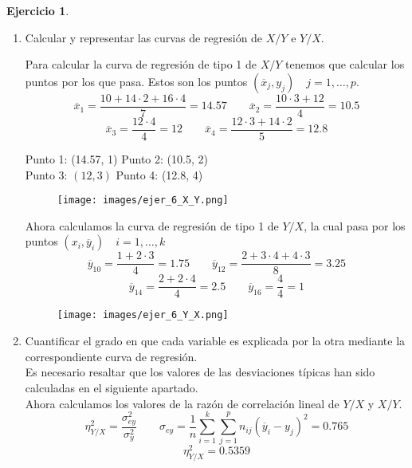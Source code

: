 \documentclass[a4paper, 12pt]{article}
\theoremstyle{definition}
\newtheorem{ej}{Ejercicio}
\begin{document}
\begin{ej}
\begin{enumerate}[label=\alph*)]
	\item Calcular y representar las curvas de regresión de \(X/Y\) e \(Y/X\).
	
	Para calcular la curva de regresión de tipo 1 de \(X/Y\) tenemos que calcular los puntos por los que pasa. Estos son los puntos \((\overline{x}_j, y_j) \quad j=1,\dotsc, p.\)
\[
	\overline{x}_1 = \frac{10 + 14 \cdot 2 + 16 \cdot4}{7} = 14.57 \qquad \overline{x}_2 = \frac{10 \cdot 3 + 12}{4} = 10.5
\]
\[
	\overline{x}_3 = \frac{12 \cdot 4}{4} = 12 \qquad \overline{x}_4 = \frac{12 \cdot 3 + 14 \cdot 2}{5} = 12.8
\]

Punto 1: (14.57, 1) \hspace{1cm} Punto 2: (10.5, 2) \hspace{1cm}  \\

Punto 3: \((12, 3)\) \hspace{1cm} Punto 4: (12.8, 4)


\begin{figure}[h!]
\centering
\texttt{[image: images/ejer\_6\_X\_Y.png]}
\end{figure}

Ahora calculamos la curva de regresión de tipo 1 de \(Y/X\), la cual pasa por los puntos \((x_i, \overline{y}_i) \quad i=1,\dotsc,k\)
\[
	\overline{y}_{10} = \frac{1 + 2 \cdot 3}{4} = 1.75 \qquad \overline{y}_12 = \frac{2 + 3 \cdot 4 + 4 \cdot 3}{8} = 3.25
\]
\[
	\overline{y}_{14} = \frac{2 + 2 \cdot 4}{4} = 2.5 \qquad \overline{y}_{16} = \frac{4}{4} = 1
\]

\newpage

\begin{figure}[h!]
\centering
\texttt{[image: images/ejer\_6\_Y\_X.png]}
\end{figure}

	\item Cuantificar el grado en que cada variable es explicada por la otra mediante la correspondiente curva de regresión. \\
	
	Es necesario resaltar que los valores de las desviaciones típicas han sido calculadas en el siguiente apartado. \\
	
	Ahora calculamos los valores de la razón de correlación lineal de \(Y/X\) y \(X/Y\).
\[
	\eta_{Y/X}^{2} = \frac{\sigma_{ey}^2}{\sigma_y^2} \qquad \sigma_{ey} = \frac{1}{n} \sum_{i=1}^{k} \sum_{j=1}^{p} n_{ij} (\overline{y}_i - y_j)^2 = 0.765
\]
\[
	\eta_{Y/X}^2 = 0.5359
\]


\end{enumerate}
\end{ej}
\end{document}
